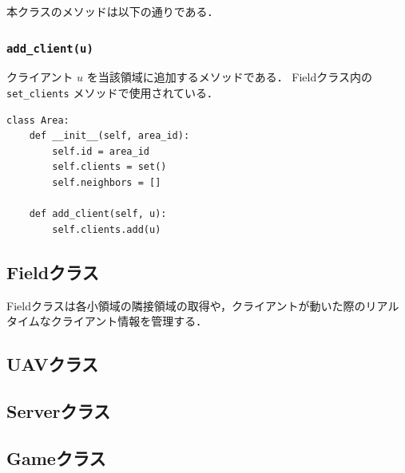 \documentclass[11pt]{jsarticle}
\begin{document}
本クラスのメソッドは以下の通りである．
\subsubsection{\texttt{add\_client(u)}}
クライアント \(u\) を当該領域に追加するメソッドである．
Fieldクラス内の \verb|set_clients| メソッドで使用されている．

\begin{lstlisting}[caption=Areaクラス]
class Area:
    def __init__(self, area_id):
        self.id = area_id
        self.clients = set()
        self.neighbors = []

    def add_client(self, u):
        self.clients.add(u)
\end{lstlisting}

\subsection{Fieldクラス}
Fieldクラスは各小領域の隣接領域の取得や，クライアントが動いた際のリアルタイムなクライアント情報を管理する．

\subsection{UAVクラス}


\subsection{Serverクラス}


\subsection{Gameクラス}
\end{document}
